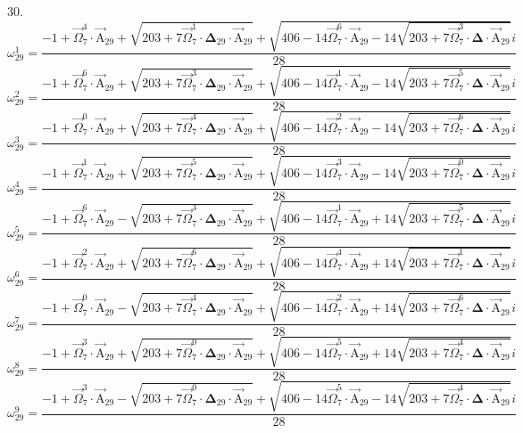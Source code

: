 \documentclass{article}
\begin{document}
30.
\[ \omega_{29}^{1}=\frac{-1+\vec{\Omega}_{7}^{4}\cdot\vec{\mathrm{A}}_{29}+\sqrt{203+7\vec{\Omega}_{7}^{1}\cdot\boldsymbol{\Delta}_{29}\cdot\vec{\mathrm{A}}_{29}}+\sqrt{406-14\vec{\Omega}_{7}^{6}\cdot\vec{\mathrm{A}}_{29}-14\sqrt{203+7\vec{\Omega}_{7}^{3}\cdot\boldsymbol{\Delta}\cdot\vec{\mathrm{A}}_{29}}}i}{28} \]
\[ \omega_{29}^{2}=\frac{-1+\vec{\Omega}_{7}^{6}\cdot\vec{\mathrm{A}}_{29}+\sqrt{203+7\vec{\Omega}_{7}^{3}\cdot\boldsymbol{\Delta}_{29}\cdot\vec{\mathrm{A}}_{29}}+\sqrt{406-14\vec{\Omega}_{7}^{1}\cdot\vec{\mathrm{A}}_{29}-14\sqrt{203+7\vec{\Omega}_{7}^{5}\cdot\boldsymbol{\Delta}\cdot\vec{\mathrm{A}}_{29}}}i}{28} \]
\[ \omega_{29}^{3}=\frac{-1+\vec{\Omega}_{7}^{0}\cdot\vec{\mathrm{A}}_{29}+\sqrt{203+7\vec{\Omega}_{7}^{4}\cdot\boldsymbol{\Delta}_{29}\cdot\vec{\mathrm{A}}_{29}}+\sqrt{406-14\vec{\Omega}_{7}^{2}\cdot\vec{\mathrm{A}}_{29}-14\sqrt{203+7\vec{\Omega}_{7}^{6}\cdot\boldsymbol{\Delta}\cdot\vec{\mathrm{A}}_{29}}}i}{28} \]
\[ \omega_{29}^{4}=\frac{-1+\vec{\Omega}_{7}^{1}\cdot\vec{\mathrm{A}}_{29}+\sqrt{203+7\vec{\Omega}_{7}^{5}\cdot\boldsymbol{\Delta}_{29}\cdot\vec{\mathrm{A}}_{29}}+\sqrt{406-14\vec{\Omega}_{7}^{3}\cdot\vec{\mathrm{A}}_{29}-14\sqrt{203+7\vec{\Omega}_{7}^{0}\cdot\boldsymbol{\Delta}\cdot\vec{\mathrm{A}}_{29}}}i}{28} \]
\[ \omega_{29}^{5}=\frac{-1+\vec{\Omega}_{7}^{6}\cdot\vec{\mathrm{A}}_{29}-\sqrt{203+7\vec{\Omega}_{7}^{3}\cdot\boldsymbol{\Delta}_{29}\cdot\vec{\mathrm{A}}_{29}}+\sqrt{406-14\vec{\Omega}_{7}^{1}\cdot\vec{\mathrm{A}}_{29}+14\sqrt{203+7\vec{\Omega}_{7}^{5}\cdot\boldsymbol{\Delta}\cdot\vec{\mathrm{A}}_{29}}}i}{28} \]
\[ \omega_{29}^{6}=\frac{-1+\vec{\Omega}_{7}^{2}\cdot\vec{\mathrm{A}}_{29}+\sqrt{203+7\vec{\Omega}_{7}^{6}\cdot\boldsymbol{\Delta}_{29}\cdot\vec{\mathrm{A}}_{29}}+\sqrt{406-14\vec{\Omega}_{7}^{4}\cdot\vec{\mathrm{A}}_{29}+14\sqrt{203+7\vec{\Omega}_{7}^{1}\cdot\boldsymbol{\Delta}\cdot\vec{\mathrm{A}}_{29}}}i}{28} \]
\[ \omega_{29}^{7}=\frac{-1+\vec{\Omega}_{7}^{0}\cdot\vec{\mathrm{A}}_{29}-\sqrt{203+7\vec{\Omega}_{7}^{4}\cdot\boldsymbol{\Delta}_{29}\cdot\vec{\mathrm{A}}_{29}}+\sqrt{406-14\vec{\Omega}_{7}^{2}\cdot\vec{\mathrm{A}}_{29}+14\sqrt{203+7\vec{\Omega}_{7}^{6}\cdot\boldsymbol{\Delta}\cdot\vec{\mathrm{A}}_{29}}}i}{28} \]
\[ \omega_{29}^{8}=\frac{-1+\vec{\Omega}_{7}^{3}\cdot\vec{\mathrm{A}}_{29}+\sqrt{203+7\vec{\Omega}_{7}^{0}\cdot\boldsymbol{\Delta}_{29}\cdot\vec{\mathrm{A}}_{29}}+\sqrt{406-14\vec{\Omega}_{7}^{5}\cdot\vec{\mathrm{A}}_{29}+14\sqrt{203+7\vec{\Omega}_{7}^{4}\cdot\boldsymbol{\Delta}\cdot\vec{\mathrm{A}}_{29}}}i}{28} \]
\[ \omega_{29}^{9}=\frac{-1+\vec{\Omega}_{7}^{3}\cdot\vec{\mathrm{A}}_{29}-\sqrt{203+7\vec{\Omega}_{7}^{0}\cdot\boldsymbol{\Delta}_{29}\cdot\vec{\mathrm{A}}_{29}}+\sqrt{406-14\vec{\Omega}_{7}^{5}\cdot\vec{\mathrm{A}}_{29}-14\sqrt{203+7\vec{\Omega}_{7}^{4}\cdot\boldsymbol{\Delta}\cdot\vec{\mathrm{A}}_{29}}}i}{28} \]
\end{document}
